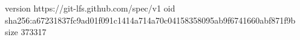 version https://git-lfs.github.com/spec/v1
oid sha256:a67231837fc9ad01f091c1414a714a70c04158358095ab9f6741660abf871f9b
size 373317
